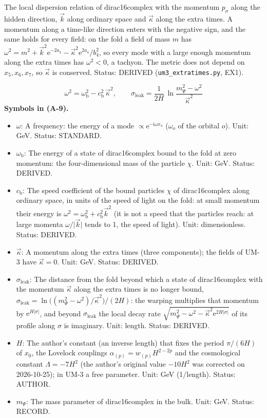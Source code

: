\documentclass[
  10pt,
]{article}
\providecommand{\tightlist}{%
  \setlength{\itemsep}{0pt}\setlength{\parskip}{0pt}}
\begin{document}
The local dispersion relation of dirac16complex with the momentum
\(p_\sigma\) along the hidden direction, \(\vec k\) along ordinary space
and \(\vec\kappa\) along the extra times. A momentum along a time-like
direction enters with the negative sign, and the same holds for every
field: on the fold a field of mass \(m\) has
\(\omega^2 = m^2 + \vec k^2\mathrm{e}^{-2a_4} - \vec\kappa^2\mathrm{e}^{2a_4}/b_4^2\),
so every mode with a large enough momentum along the extra times has
\(\omega^2 < 0\), a tachyon. The metric does not depend on
\(x_5, x_6, x_7\), so \(\vec\kappa\) is conserved. Status: DERIVED
(\texttt{um3\_extratimes.py}, EX1).

\[
\omega^2 = \omega_{\mathrm{b}}^2 - c_{\mathrm{b}}^2\,\vec\kappa^2,\qquad
\sigma_{\mathrm{leak}} = \frac{1}{2H}\,\ln\frac{m_\Psi^2 - \omega^2}{\vec\kappa^2} \tag{A-9}
\] \textbf{Symbols in (A-9).}

\begin{itemize}
\tightlist
\item
  \(\omega\): A frequency: the energy of a mode
  \(\propto \mathrm{e}^{-\mathrm{i}\omega x_4}\) (\(\omega_o\) of the
  orbital \(o\)). Unit: GeV. Status: STANDARD.
\item
  \(\omega_{\mathrm{b}}\): The energy of a state of dirac16complex bound
  to the fold at zero momentum: the four-dimensional mass of the
  particle \(\chi\). Unit: GeV. Status: DERIVED.
\item
  \(c_{\mathrm{b}}\): The speed coefficient of the bound particles
  \(\chi\) of dirac16complex along ordinary space, in units of the speed
  of light on the fold: at small momentum their energy is
  \(\omega^2 = \omega_{\mathrm{b}}^2 + c_{\mathrm{b}}^2\vec k^2\) (it is
  not a speed that the particles reach: at large momenta
  \(\omega/\lvert\vec k\rvert\) tends to 1, the speed of light). Unit:
  dimensionless. Status: DERIVED.
\item
  \(\vec\kappa\): A momentum along the extra times (three components);
  the fields of UM-3 have \(\vec\kappa = 0\). Unit: GeV. Status:
  DERIVED.
\item
  \(\sigma_{\mathrm{leak}}\): The distance from the fold beyond which a
  state of dirac16complex with the momentum \(\vec\kappa\) along the
  extra times is no longer bound,
  \(\sigma_{\mathrm{leak}} = \ln\big((m_\Psi^2 - \omega^2)/\vec\kappa^2\big)/(2H)\):
  the warping multiplies that momentum by
  \(\mathrm{e}^{H\lvert\sigma\rvert}\), and beyond
  \(\sigma_{\mathrm{leak}}\) the local decay rate
  \(\sqrt{m_\Psi^2 - \omega^2 - \vec\kappa^2\mathrm{e}^{2H\lvert\sigma\rvert}}\)
  of its profile along \(\sigma\) is imaginary. Unit: length. Status:
  DERIVED.
\item
  \(H\): The author's constant (an inverse length) that fixes the period
  \(\pi/(6H)\) of \(x_0\), the Lovelock couplings
  \(\alpha_{(p)} = w_{(p)}H^{2-2p}\) and the cosmological constant
  \(\Lambda = -7H^2\) (the author's original value \(-10H^2\) was
  corrected on 2026-10-25); in UM-3 a free parameter. Unit: GeV
  (1/length). Status: AUTHOR.
\item
  \(m_\Psi\): The mass parameter of dirac16complex in the bulk. Unit:
  GeV. Status: RECORD.
\end{itemize}
\end{document}
